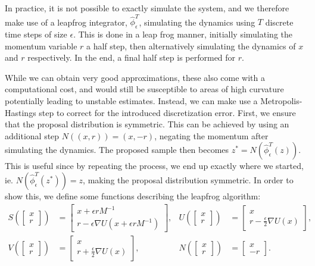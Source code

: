 In practice, it is not possible to exactly simulate the system, and we therefore make use of a leapfrog integrator, $\hat{\phi}_\epsilon^T$, simulating the dynamics using $T$ discrete time steps of size $\epsilon$. 
This is done in a leap frog manner, initially simulating the momentum variable $r$ a half step, then alternatively simulating the dynamics of $x$ and $r$ respectively.
In the end, a final half step is performed for $r$.

While we can obtain very good approximations, these also come with a computational cost, and would still be susceptible to areas of high curvature potentially leading to unstable estimates. 
Instead, we can make use a Metropolis-Hastings step to correct for the introduced discretization error.
First, we ensure that the proposal distribution is symmetric.
This can be achieved by using an additional step $N((x, r)) = (x, -r)$, negating the momentum after simulating the dynamics.
The proposed sample then becomes $z^\ast = N(\hat{\phi}_\epsilon^T(z)) $.
This is useful since by repeating the process, we end up exactly where we started, ie. $N(\hat{\phi}_\epsilon^T(z^\ast)) = z$, making the proposal distribution symmetric.
In order to show this, we define some functions describing the leapfrog algorithm:
\begin{align} 
    S \left(\begin{bmatrix} x \\ r \end{bmatrix}\right) 
    &= \begin{bmatrix} x + \epsilon r M^{-1} \\ r - \epsilon \nabla U(x + \epsilon r M^{-1}) \end{bmatrix}, &
    U\left(\begin{bmatrix} x \\ r \end{bmatrix}\right) 
    &= \begin{bmatrix} x \\ r - \frac{\epsilon}{2} \nabla U(x) \end{bmatrix}, \label{eq:leapfrog-defs:1} \\
    V\left(\begin{bmatrix} x \\ r \end{bmatrix}\right)
    &= \begin{bmatrix} x \\ r + \frac{\epsilon}{2} \nabla U(x) \end{bmatrix}, &
    N \left(\begin{bmatrix} x \\ r \end{bmatrix}\right) 
    &= \begin{bmatrix} x \\ -r \label{eq:leapfrog-defs:2}
    \end{bmatrix}. 
\end{align}
